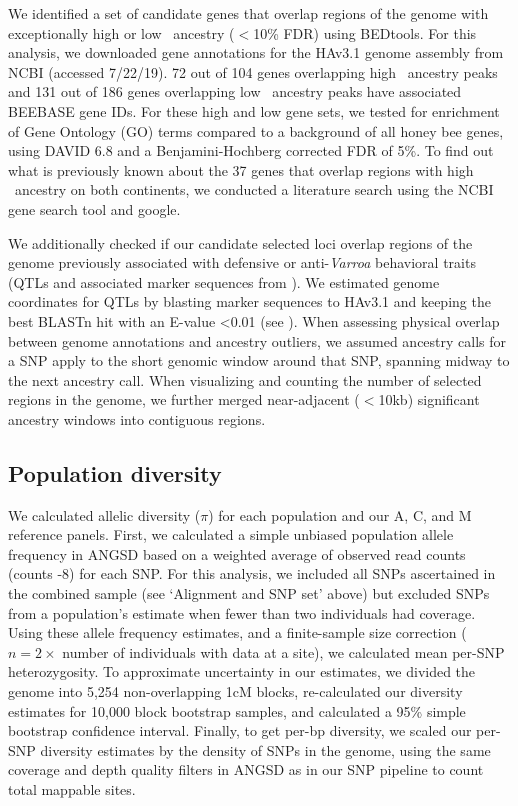 We identified a set of candidate genes that overlap regions of the genome with exceptionally high or low \A\ ancestry ($<$10\% FDR) using BEDtools. For this analysis, we downloaded gene annotations for the HAv3.1 genome assembly from NCBI (accessed 7/22/19). 72 out of 104 genes overlapping high \A\ ancestry peaks and 131 out of 186 genes overlapping low \A\ ancestry peaks have associated BEEBASE gene IDs. For these high and low gene sets, we tested for enrichment of Gene Ontology (GO) terms compared to a background of all honey bee genes, using DAVID 6.8 \cite{Huang:2009gk} and a Benjamini-Hochberg corrected FDR of 5\%. To find out what is previously known about the 37 genes that overlap regions with high \A\  ancestry on both continents, we conducted a literature search using the NCBI gene search tool and google. 

We additionally checked if our candidate selected loci overlap regions of the genome previously associated with defensive or anti-\textit{Varroa} behavioral traits (QTLs and associated marker sequences from \cite{ArechavaletaVelasco:2012cm,Oxley:2010dw,Tsuruda:2012fa,Spotter:2012dx,Hunt:1998th,Hunt:2007im,ArechavaletaVelasco:2003io,Solignac:2007dh,Harpur:HuntMarkers}). We estimated genome coordinates for QTLs by blasting marker sequences to HAv3.1 and keeping the best BLASTn \cite{Altschul:1990dw} hit with an E-value \textless 0.01 (see ). When assessing physical overlap between genome annotations and ancestry outliers, we assumed ancestry calls for a SNP apply to the short genomic window around that SNP, spanning midway to the next ancestry call. When visualizing and counting the number of selected regions in the genome, we further merged near-adjacent ($<$10kb) significant ancestry windows into contiguous regions.

\subsection*{Population diversity}
We calculated allelic diversity ($\pi$) for each population and our A, C, and M reference panels. First, we calculated a simple unbiased population allele frequency in ANGSD based on a weighted average of observed read counts (counts -8) for each SNP. For this analysis, we included all SNPs ascertained in the combined sample (see ‘Alignment and SNP set' above) but excluded SNPs from a population's estimate when fewer than two individuals had coverage. Using these allele frequency estimates, and a finite-sample size correction ($ n = 2 \times$ number of individuals with data at a site), we calculated mean per-SNP heterozygosity. To approximate uncertainty in our estimates, we divided the genome into 5,254 non-overlapping 1cM blocks, re-calculated our diversity estimates for 10,000 block bootstrap samples, and calculated a 95\% simple bootstrap confidence interval. Finally, to get per-bp diversity, we scaled our per-SNP diversity estimates by the density of SNPs in the genome, using the same coverage and depth quality filters in ANGSD as in our SNP pipeline to count total mappable sites.

